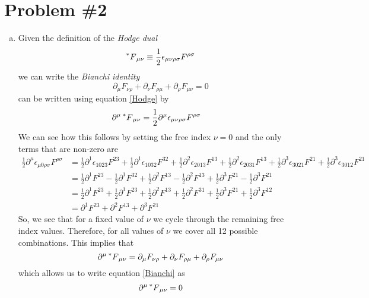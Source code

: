 \documentclass[11pt]{article}
\numberwithin{equation}{section}
\begin{document}
\pagebreak

\section{Problem \#2}
\begin{enumerate}[(a)]
\item
    Given the definition of the \emph{Hodge dual}
    \begin{equation}
        \prescript{*}{}{F}_{\mu\nu} \equiv \frac{1}{2}\epsilon_{\mu\nu\rho\sigma}F^{\rho\sigma}
        \label{Hodge}
    \end{equation}
    we can write the \emph{Bianchi identity}
    \begin{equation}
        \partial_{\mu}F_{\nu\rho} + \partial_{\nu}F_{\rho\mu} + \partial_{\rho}F_{\mu\nu} = 0
        \label{Bianchi}
    \end{equation}
    can be written using equation \ref{Hodge} by 
    \begin{align*}
        \partial^{\mu} \prescript{*}{}{F}_{\mu\nu} &= \frac{1}{2}\partial^{\mu}\epsilon_{\mu\nu\rho\sigma}F^{\rho\sigma}
    \end{align*}
    We can see how this follows by setting the free index $\nu=0$ and the only terms that are non-zero are
    \begin{align*}
        \frac{1}{2}\partial^{\mu}\epsilon_{\mu0\rho\sigma}F^{\rho\sigma} &=
                \frac{1}{2}\partial^{1}\epsilon_{1023}F^{23} + \frac{1}{2}\partial^{1}\epsilon_{1032}F^{32} +
                \frac{1}{2}\partial^{2}\epsilon_{2013}F^{13} + \frac{1}{2}\partial^{2}\epsilon_{2031}F^{13} +
                \frac{1}{2}\partial^{3}\epsilon_{3021}F^{21} + \frac{1}{2}\partial^{3}\epsilon_{3012}F^{21} \\
                &= \frac{1}{2}\partial^{1}F^{23} - \frac{1}{2}\partial^{1}F^{32} +
                \frac{1}{2}\partial^{2}F^{13} - \frac{1}{2}\partial^{2}F^{13} +
                \frac{1}{2}\partial^{3}F^{21} - \frac{1}{2}\partial^{3}F^{21} \\
                &= \frac{1}{2}\partial^{1}F^{23} + \frac{1}{2}\partial^{1}F^{23} +
                \frac{1}{2}\partial^{2}F^{13} + \frac{1}{2}\partial^{2}F^{31} +
                \frac{1}{2}\partial^{3}F^{21} + \frac{1}{2}\partial^{3}F^{12} \\
                &= \partial^{1}F^{23} + \partial^{2}F^{13} + \partial^{3}F^{21} 
    \end{align*}
    So, we see that for a fixed value of $\nu$ we cycle through the remaining free index values. Therefore, for all
    values of $\nu$ we cover all 12 possible combinations. This implies that
    $$\partial^{\mu} \prescript{*}{}{F}_{\mu\nu} = \partial_{\mu}F_{\nu\rho} + \partial_{\nu}F_{\rho\mu} + \partial_{\rho}F_{\mu\nu}$$
    which allows us to write equation \ref{Bianchi} as
    $$\partial^{\mu} \prescript{*}{}{F}_{\mu\nu} = 0$$


\end{enumerate}
\end{document}
